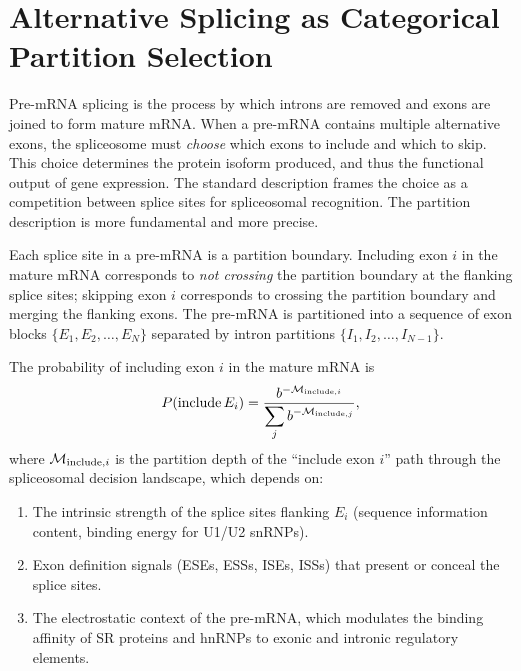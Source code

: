 \section{Alternative Splicing as Categorical Partition Selection}
\label{sec:splicing_partitions}

Pre-mRNA splicing is the process by which introns are removed and exons are
joined to form mature mRNA. When a pre-mRNA contains multiple alternative
exons, the spliceosome must \emph{choose} which exons to include and which to
skip. This choice determines the protein isoform produced, and thus the
functional output of gene expression. The standard description frames the
choice as a competition between splice sites for spliceosomal recognition. The
partition description is more fundamental and more precise.

\begin{definition}
\label{def:splice_boundary}
Each splice site in a pre-mRNA is a partition boundary. Including exon $i$
in the mature mRNA corresponds to \emph{not crossing} the partition boundary
at the flanking splice sites; skipping exon $i$ corresponds to crossing
the partition boundary and merging the flanking exons. The pre-mRNA is
partitioned into a sequence of exon blocks $\{E_1, E_2, \ldots, E_N\}$
separated by intron partitions $\{I_1, I_2, \ldots, I_{N-1}\}$.
\end{definition}

\begin{theorem}
\label{thm:splicing_partition}
The probability of including exon $i$ in the mature mRNA is
\begin{equation}
  P(\text{include}\,E_i) = \frac{b^{-\mathcal{M}_{\mathrm{include},i}}}{\displaystyle\sum_{j}
  b^{-\mathcal{M}_{\mathrm{include},j}}},
  \label{eq:splicing_probability}
\end{equation}
where $\mathcal{M}_{\mathrm{include},i}$ is the partition depth of the
``include exon $i$'' path through the spliceosomal decision landscape, which
depends on:
\begin{enumerate}[label=(\alph*)]
  \item The intrinsic strength of the splice sites flanking $E_i$ (sequence
        information content, binding energy for U1/U2 snRNPs).
  \item Exon definition signals (ESEs, ESSs, ISEs, ISSs) that present or
        conceal the splice sites.
  \item The electrostatic context of the pre-mRNA, which modulates the
        binding affinity of SR proteins and hnRNPs to exonic and intronic
        regulatory elements.
\end{enumerate}
\end{theorem}

